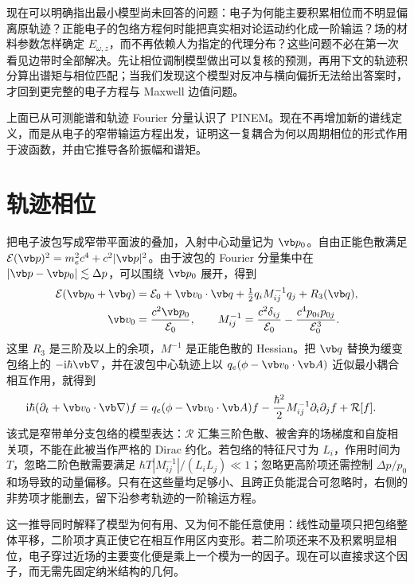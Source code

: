 现在可以明确指出最小模型尚未回答的问题：电子为何能主要积累相位而不明显偏离原轨迹？正能电子的包络方程何时能把真实相对论运动约化成一阶输运？场的材料参数怎样确定 $E_{\omega,z}$，而不再依赖人为指定的代理分布？这些问题不必在第一次看见边带时全部解决。先让相位调制模型做出可以复核的预测，再用下文的轨迹积分算出谱矩与相位匹配；当我们发现这个模型对反冲与横向偏折无法给出答案时，才回到更完整的电子方程与 Maxwell 边值问题。


\par\medskip
上面已从可测能谱和轨迹 Fourier 分量认识了 PINEM。现在不再增加新的谱线定义，而是从电子的窄带输运方程出发，证明这一复耦合为何以周期相位的形式作用于波函数，并由它推导各阶振幅和谱矩。
\par\medskip


\section{轨迹相位}
把电子波包写成窄带平面波的叠加，入射中心动量记为 $\vb p_0$。自由正能色散满足 $\mathcal E(\vb p)^2=m_e^2c^4+c^2|\vb p|^2$。由于波包的 Fourier 分量集中在 $|\vb p-\vb p_0|\lesssim\Delta p$，可以围绕 $\vb p_0$ 展开，得到
\begin{align}
\mathcal E(\vb p_0+\vb q)
&=\mathcal E_0+\vb v_0\cdot\vb q
+\tfrac12q_iM^{-1}_{ij}q_j+R_3(\vb q),\\
\vb v_0&=\frac{c^2\vb p_0}{\mathcal E_0},\qquad
M^{-1}_{ij}=\frac{c^2\delta_{ij}}{\mathcal E_0}-\frac{c^4p_{0i}p_{0j}}{\mathcal E_0^3}.
\label{eq:packet-dispersion-intro}
\end{align}
这里 $R_3$ 是三阶及以上的余项，$M^{-1}$ 是正能色散的 Hessian。把 $\vb q$ 替换为缓变包络上的 $-\ii\hbar\vb\nabla$，并在波包中心轨迹上以 $q_e(\phi-\vb v_0\cdot\vb A)$ 近似最小耦合相互作用，就得到
\begin{align}
\ii\hbar(\partial_t+\vb v_0\cdot\vb\nabla)f
&=q_e(\phi-\vb v_0\cdot\vb A)f
-\frac{\hbar^2}{2}M^{-1}_{ij}\partial_i\partial_jf+\mathcal R[f].
\label{eq:packet-transport-with-remainder}
\end{align}
该式是窄带单分支包络的模型表达：$\mathcal R$ 汇集三阶色散、被舍弃的场梯度和自旋相关项，不能在此被当作严格的 Dirac 约化。若包络的特征尺寸为 $L_i$，作用时间为 $T$，忽略二阶色散需要满足 $\hbar T|M^{-1}_{ij}|/(L_iL_j)\ll1$；忽略更高阶项还需控制 $\Delta p/p_0$ 和场导致的动量偏移。只有在这些量均足够小、且跨正负能混合可忽略时，右侧的非势项才能删去，留下沿参考轨迹的一阶输运方程。

这一推导同时解释了模型为何有用、又为何不能任意使用：线性动量项只把包络整体平移，二阶项才真正使它在相互作用区内变形。若二阶项还来不及积累明显相位，电子穿过近场的主要变化便是乘上一个模为一的因子。现在可以直接求这个因子，而无需先固定纳米结构的几何。


